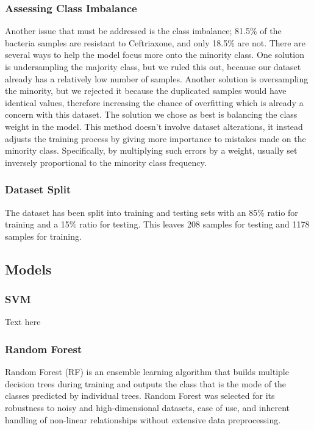 \documentclass{article}
\begin{document}
\subsubsection{Assessing Class Imbalance}

Another issue that must be addressed is the class imbalance; 81.5\% of the bacteria samples are resistant to Ceftriaxone, and only 18.5\% are not. There are several ways to help the model focus more onto the minority class. One solution is undersampling the majority class, but we ruled this out, because our dataset already has a relatively low number of samples. Another solution is oversampling the minority, but we rejected it because the duplicated samples would have identical values, therefore increasing the chance of overfitting which is already a concern with this dataset. The solution we chose as best is balancing the class weight in the model. This method doesn't involve dataset alterations, it instead adjusts the training process by giving more importance to mistakes made on the minority class. Specifically, by multiplying such errors by a weight, usually set inversely proportional to the minority class frequency.

\subsubsection{Dataset Split}

The dataset has been split into training and testing sets with an 85\% ratio for training and a 15\% ratio for testing. This leaves 208 samples for testing and 1178 samples for training.

\subsection{Models}
\subsubsection{SVM}
Text here

\subsubsection{Random Forest}
Random Forest (RF) is an ensemble learning algorithm that builds multiple decision trees during training and outputs the class that is the mode of the classes predicted by individual trees. Random Forest was selected for its robustness to noisy and high-dimensional datasets, ease of use, and inherent handling of non-linear relationships without extensive data preprocessing.
\end{document}
